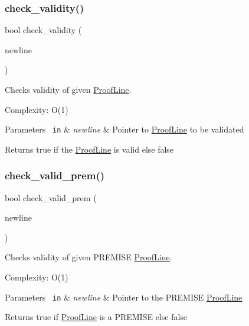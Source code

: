 \subsubsection{\texorpdfstring{check\+\_\+validity()}{check\_validity()}}
{\footnotesize\ttfamily bool check\+\_\+validity (\begin{DoxyParamCaption}\item[{\mbox{\hyperlink{classProofLine}{Proof\+Line}} $\ast$}]{newline }\end{DoxyParamCaption})\hspace{0.3cm}{\ttfamily [related]}}



Checks validity of given \mbox{\hyperlink{classProofLine}{Proof\+Line}}. 

Complexity\+: O(1) 
\begin{DoxyParams}[1]{Parameters}
\mbox{\texttt{ in}}  & {\em newline} & Pointer to \mbox{\hyperlink{classProofLine}{Proof\+Line}} to be validated \\
\hline
\end{DoxyParams}
\begin{DoxyReturn}{Returns}
true if the \mbox{\hyperlink{classProofLine}{Proof\+Line}} is valid else false 
\end{DoxyReturn}
\mbox{\label{classProofLine_a3d9c86a35ee3da94e663c41d40ff279b}} 
\subsubsection{\texorpdfstring{check\+\_\+valid\+\_\+prem()}{check\_valid\_prem()}}
{\footnotesize\ttfamily bool check\+\_\+valid\+\_\+prem (\begin{DoxyParamCaption}\item[{\mbox{\hyperlink{classProofLine}{Proof\+Line}} $\ast$}]{newline }\end{DoxyParamCaption})\hspace{0.3cm}{\ttfamily [related]}}



Checks validity of given P\+R\+E\+M\+I\+SE \mbox{\hyperlink{classProofLine}{Proof\+Line}}. 

Complexity\+: O(1) 
\begin{DoxyParams}[1]{Parameters}
\mbox{\texttt{ in}}  & {\em newline} & Pointer to the P\+R\+E\+M\+I\+SE \mbox{\hyperlink{classProofLine}{Proof\+Line}} \\
\hline
\end{DoxyParams}
\begin{DoxyReturn}{Returns}
true if \mbox{\hyperlink{classProofLine}{Proof\+Line}} is a P\+R\+E\+M\+I\+SE else false 
\end{DoxyReturn}
\mbox{\label{classProofLine_a118aab7800af68c5b32fa5e103c75741}} 
